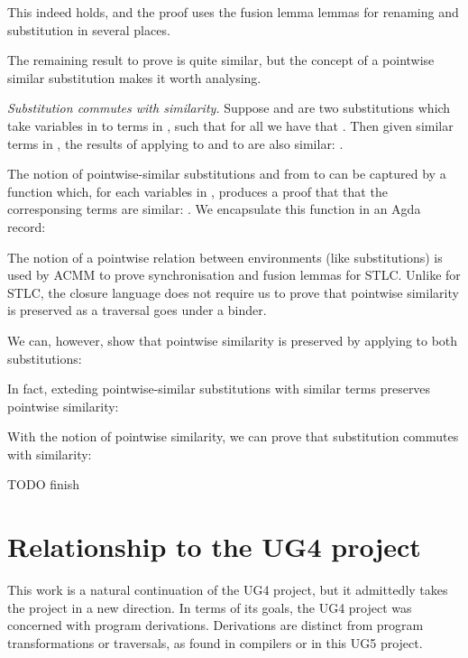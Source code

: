 \documentclass[bsc,frontabs,twoside,singlespacing,parskip,deptreport]{infthesis}
\theoremstyle{definition}
\begin{document}
This indeed holds, and the proof uses the fusion lemma lemmas for
renaming and substitution in several places.

The remaining result to prove is quite similar, but the concept of a
pointwise similar substitution makes it worth analysing.

\textit{Substitution commutes with similarity.} Suppose  and 
are two 
substitutions which take variables  in  to terms in ,
such that for all  we have that . Then given similar terms  in , the results
of applying  to  and  to  are also
similar: .

The notion of pointwise-similar substitutions  and  from
 to 
can be captured by a function which, for each variables  in
, produces a proof that that the corresponsing terms are
similar: . We encapsulate this function
in an Agda record:


The notion of a pointwise relation between environments (like
substitutions) is used by ACMM to prove synchronisation and fusion
lemmas for STLC. Unlike for STLC, the closure language \lcl does not
require us to prove that pointwise similarity is preserved as a
traversal goes under a binder.

We can, however, show that pointwise similarity is preserved by
applying  to both substitutions:


In fact, exteding pointwise-similar substitutions with similar terms
preserves pointwise similarity:


With the notion of pointwise similarity, we can prove that
substitution commutes with similarity:


TODO finish

\chapter{Relationship to the UG4 project}

This work is a natural continuation of the UG4 project, but it
admittedly takes the project in a new direction. In terms of its
goals, the UG4 project was concerned with program
derivations. Derivations are distinct from program transformations or
traversals, as found in compilers or in this UG5 project.
\end{document}
